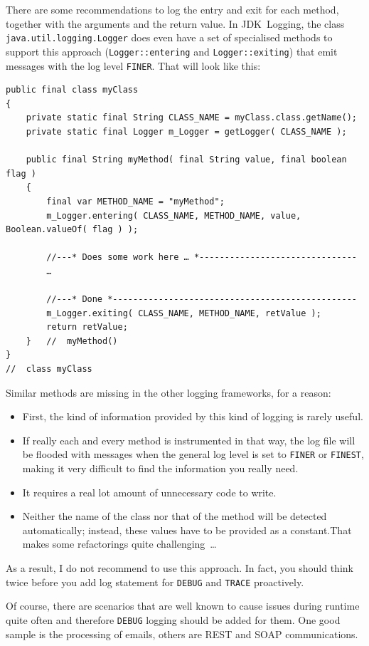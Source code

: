 \documentclass[11pt,a4paper, titlepage, parskip=half, headsepline, footsepline, cleardoublepage=current, headheight=1cm]{scrbook}
\begin{document}
There are some recommendations to log the entry and exit for each method, together with the arguments and the return value. In JDK~Logging, the class \lstinline|java.util.logging.Logger| does even have a set of specialised methods to support this approach (\lstinline|Logger::entering| and \lstinline|Logger::exiting|) that emit messages with the log level \verb#FINER#. That will look like this:
\begin{lstlisting}
public final class myClass
{
    private static final String CLASS_NAME = myClass.class.getName();
    private static final Logger m_Logger = getLogger( CLASS_NAME );
    
    public final String myMethod( final String value, final boolean flag )
    {
        final var METHOD_NAME = "myMethod";
        m_Logger.entering( CLASS_NAME, METHOD_NAME, value, Boolean.valueOf( flag ) );
        
        //---* Does some work here … *-------------------------------
        …
    
        //---* Done *------------------------------------------------
        m_Logger.exiting( CLASS_NAME, METHOD_NAME, retValue );
        return retValue;
    }   //  myMethod()
}
//  class myClass
\end{lstlisting}
Similar methods are missing in the other logging frameworks, for a reason:
\begin{itemize}
\item{First, the kind of information provided by this kind of logging is rarely useful.}
\item{If really each and every method is instrumented in that way, the log file will be flooded with messages when the general log level is set to \verb#FINER# or \verb#FINEST#, making it very difficult to find the information you really need.}
\item{It requires a real lot amount of unnecessary code to write.}
\item{Neither the name of the class nor that of the method will be detected automatically; instead, these values have to be provided as a constant.That makes some refactorings quite challenging~…}
\end{itemize}

As a result, I do not recommend to use this approach. In fact, you should think twice before you add log statement for \verb#DEBUG# and \verb#TRACE# proactively.

Of course, there are scenarios that are well known to cause issues during runtime quite often and therefore \verb#DEBUG# logging should be added for them. One good sample is the processing of emails, others are REST and SOAP communications.
\end{document}
